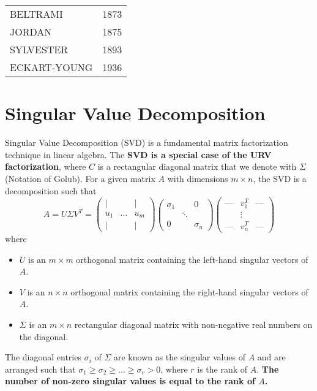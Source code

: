 \begin{tabular}{l l}
BELTRAMI & 1873 \\
JORDAN & 1875 \\
SYLVESTER & 1893 \\
ECKART-YOUNG & 1936 \\
\end{tabular}

\section{Singular Value Decomposition}
Singular Value Decomposition (SVD) is a fundamental matrix factorization technique in linear algebra.
The \textbf{SVD is a special case of the URV factorization}, where $C$ is a rectangular diagonal matrix that we denote with $\Sigma$ (Notation of Golub).
For a given matrix $A$ with dimensions $m \times n$, the SVD is a decomposition such that
\[
A = U \Sigma V^T = 
\begin{pmatrix}
\vert & & \vert \\
u_1 & \dots & u_m \\
\vert & & \vert
\end{pmatrix}
\begin{pmatrix}
\sigma_1 & & 0 \\
& \ddots & \\
0 & & \sigma_n
\end{pmatrix}
\begin{pmatrix}
\text{---} & v_1^T & \text{---} \\
& \vdots & \\
\text{---} & v_n^T & \text{---}
\end{pmatrix}
\]
where
\begin{itemize}
    \item $U$ is an $m \times m$ orthogonal matrix containing the left-hand singular vectors of $A$.
    \item $V$ is an $n \times n$ orthogonal matrix containing the right-hand singular vectors of $A$.
    \item $\Sigma$ is an $m \times n$ rectangular diagonal matrix with non-negative real numbers on the diagonal.
\end{itemize}

The diagonal entries $\sigma_i$ of $\Sigma$ are known as the singular values of $A$
and are arranged such that $\sigma_1 \geq \sigma_2 \geq \dots \geq \sigma_r > 0$,
where $r$ is the rank of $A$. \newline
\textbf{The number of non-zero singular values is equal to the rank of $A$.}

